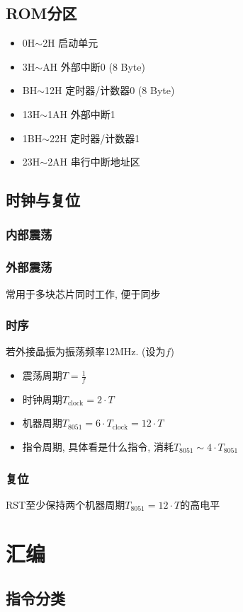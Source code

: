 \documentclass[a4paper]{report}
\begin{document}
\section{ROM分区}
\begin{itemize}
  \item 0H$\sim$2H 启动单元
  \item 3H$\sim$AH 外部中断0 (8 Byte)
  \item BH$\sim$12H 定时器/计数器0 (8 Byte)
  \item 13H$\sim$1AH 外部中断1
  \item 1BH$\sim$22H 定时器/计数器1
  \item 23H$\sim$2AH 串行中断地址区
\end{itemize}
\section{时钟与复位}
\subsection{内部震荡}
\subsection{外部震荡}
常用于多块芯片同时工作, 便于同步
\subsection{时序}
若外接晶振为振荡频率12MHz. (设为$f$)
\begin{itemize}
  \item 震荡周期$T=\frac{1}{f}$
  \item 时钟周期$T_{\text{clock}}=2\cdot T$
  \item 机器周期$T_{\text{8051}}=6\cdot T_{\text{clock}}=12\cdot T$
  \item 指令周期, 具体看是什么指令, 消耗$T_{8051}\sim 4\cdot T_{8051}$
\end{itemize}
\subsection{复位}
RST至少保持两个机器周期$T_{8051}=12\cdot T$的高电平
\chapter{汇编}
\section{指令分类}
\end{document}

